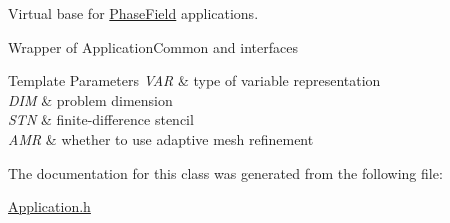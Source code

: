 Virtual base for \hyperlink{namespaceUintah_1_1PhaseField}{Phase\+Field} applications. 

Wrapper of Application\+Common and interfaces


\begin{DoxyTemplParams}{Template Parameters}
{\em V\+AR} & type of variable representation \\
\hline
{\em D\+IM} & problem dimension \\
\hline
{\em S\+TN} & finite-\/difference stencil \\
\hline
{\em A\+MR} & whether to use adaptive mesh refinement \\
\hline
\end{DoxyTemplParams}


The documentation for this class was generated from the following file\+:\begin{DoxyCompactItemize}
\item 
\hyperlink{Application_8h}{Application.\+h}\end{DoxyCompactItemize}
